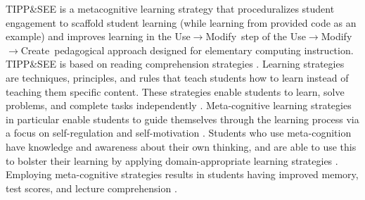 \documentclass[sigconf,manuscript,review,anonymous]{acmart} %
\def\ts{TIPP\&SEE}
\def\umc{Use\begin{math}\rightarrow\end{math}Modify\begin{math}\rightarrow\end{math}Create\ }
\def\um{Use\begin{math}\rightarrow\end{math}Modify\ }
\begin{document}
\ts{} is a metacognitive learning strategy that proceduralizes student engagement to scaffold student learning (while learning from provided code as an example) and improves learning in the \um step of the \umc pedagogical approach designed for elementary computing instruction. \ts{} is based on reading comprehension strategies \cite{salac2020tippnsee}. Learning strategies are techniques, principles, and rules that teach students how to learn instead of teaching them specific content. These strategies enable students to learn, solve problems, and complete tasks independently \cite{deshler1986learning}. Meta-cognitive learning strategies in particular enable students to guide themselves through the learning process via a focus on self-regulation and self-motivation \cite{paris1990metacognition}. Students who use meta-cognition have knowledge and awareness about their own thinking, and are able to use this to bolster their learning by applying domain-appropriate learning strategies \cite{donker2014effectiveness}. Employing meta-cognitive strategies results in students having improved memory, test scores, and lecture comprehension \cite{king1991improving, kramarski2002effects}. 

\end{document}

